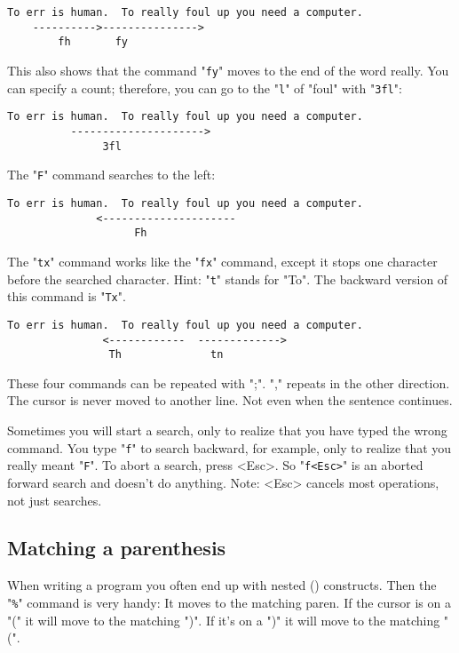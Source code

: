 		\begin{Verbatim}[samepage=true]
    To err is human.  To really foul up you need a computer. 
    ---------->--------------->
        fh       fy
		\end{Verbatim}

This also shows that the command "\verb!fy!" moves to the end of the word really.
You can specify a count; therefore, you can go to the "\verb!l!" of "foul" with "\verb!3fl!":

		\begin{Verbatim}[samepage=true]
    To err is human.  To really foul up you need a computer. 
          --------------------->
               3fl
		\end{Verbatim}

The "\verb!F!" command searches to the left:

		\begin{Verbatim}[samepage=true]
    To err is human.  To really foul up you need a computer. 
              <---------------------
                    Fh
		\end{Verbatim}

The "\verb!tx!" command works like the "\verb!fx!" command, except it stops one character before the searched character.
Hint: "\verb!t!" stands for "To".
The backward version of this command is "\verb!Tx!".

		\begin{Verbatim}[samepage=true]
    To err is human.  To really foul up you need a computer. 
               <------------  ------------->
                Th              tn
		\end{Verbatim}

These four commands can be repeated with ";".
"," repeats in the other direction.
The cursor is never moved to another line.
Not even when the sentence continues.

Sometimes you will start a search, only to realize that you have typed the wrong command.
You type "\verb!f!" to search backward, for example, only to realize that you really meant "\verb!F!".
To abort a search, press <Esc>.
So "\verb!f<Esc>!" is an aborted forward search and doesn't do anything.
Note: <Esc> cancels most operations, not just searches.

\subsection{Matching a parenthesis}

When writing a program you often end up with nested () constructs.
Then the "\verb!%!" command is very handy: It moves to the matching paren.
If the cursor is on a "(" it will move to the matching ")".
If it's on a ")" it will move to the matching "(".

